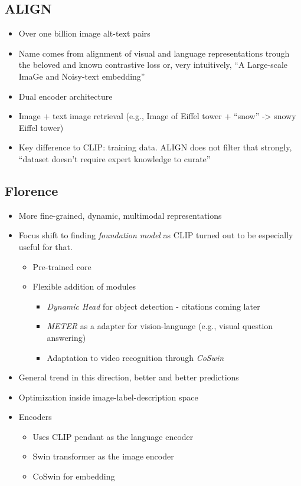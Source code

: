 \documentclass[
]{krantz}
\providecommand{\tightlist}{%
  \setlength{\itemsep}{0pt}\setlength{\parskip}{0pt}}
\begin{document}
\hypertarget{align}{%
\subsection{ALIGN}\label{align}}

\begin{itemize}
\tightlist
\item
  Over one billion image alt-text pairs
\item
  Name comes from alignment of visual and language representations trough the beloved and known contrastive loss or, very intuitively, ``A Large-scale ImaGe and Noisy-text embedding''
\item
  Dual encoder architecture
\item
  Image + text image retrieval (e.g., Image of Eiffel tower + ``snow'' -\textgreater{} snowy Eiffel tower)
\item
  Key difference to CLIP: training data. ALIGN does not filter that strongly, ``dataset doesn't require expert knowledge to curate''
\end{itemize}

\hypertarget{florence}{%
\subsection{Florence}\label{florence}}

\begin{itemize}
\tightlist
\item
  More fine-grained, dynamic, multimodal representations
\item
  Focus shift to finding \emph{foundation model} as CLIP turned out to be especially useful for that.

  \begin{itemize}
  \tightlist
  \item
    Pre-trained core
  \item
    Flexible addition of modules

    \begin{itemize}
    \tightlist
    \item
      \emph{Dynamic Head} for object detection - citations coming later
    \item
      \emph{METER} as a adapter for vision-language (e.g., visual question answering)
    \item
      Adaptation to video recognition through \emph{CoSwin}
    \end{itemize}
  \end{itemize}
\item
  General trend in this direction, better and better predictions \citep[CoCa;][]{yu2022coca}
\item
  Optimization inside image-label-description space
\item
  Encoders

  \begin{itemize}
  \tightlist
  \item
    Uses CLIP pendant as the language encoder
  \item
    Swin transformer as the image encoder
  \item
    CoSwin for embedding
  \end{itemize}
\end{itemize}
\end{document}
